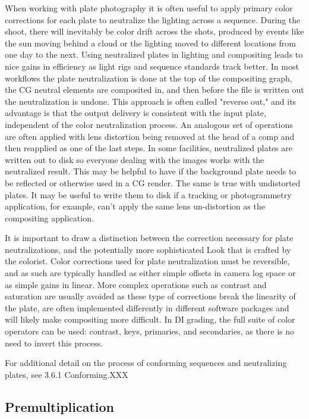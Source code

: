When working with plate photography it is often useful to apply primary color corrections for each plate to neutralize the lighting across a sequence. During the shoot, there will inevitably be color drift across the shots, produced by events like the sun moving behind a cloud or the lighting moved to different locations from one day to the next. Using neutralized plates in lighting and compositing leads to nice gains in efficiency as light rigs and sequence standards track better. In most workflows the plate neutralization is done at the top of the compositing graph, the CG neutral elements are composited in, and then before the file is written out the neutralization is undone. This approach is often called "reverse out," and its advantage is that the output delivery is consistent with the input plate, independent of the color neutralization process. An analogous set of operations are often applied with lens distortion being removed at the head of a comp and then reapplied as one of the last steps.
In some facilities, neutralized plates are written out to disk so everyone dealing with the images works with the neutralized result. This may be helpful to have if the background plate needs to be reflected or otherwise used in a CG render. The same is true with undistorted plates. It may be useful to write them to disk if a tracking or photogrammetry application, for example, can't apply the same lens un-distortion as the compositing application.

It is important to draw a distinction between the correction necessary for plate neutralizations, and the potentially more sophisticated Look that is crafted by the colorist. Color corrections used for plate neutralization must be reversible, and as such are typically handled as either simple offsets in camera log space or as simple gains in linear. More complex operations such as contrast and saturation are usually avoided as these type of corrections break the linearity of the plate, are often implemented differently in different software packages and will likely make compositing more difficult. In DI grading, the full suite of color operators can be used: contrast, keys, primaries, and secondaries, as there is no need to invert this process.

For additional detail on the process of conforming sequences and neutralizing plates, see 3.6.1 Conforming.XXX

\subsection{Premultiplication}%
\label{subsec:premultiplication}

